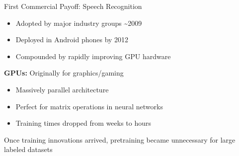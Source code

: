 \begin{frame}{First Commercial Payoff: Speech Recognition}
    \begin{itemize}
        \item Adopted by major industry groups \textasciitilde2009
        \item Deployed in Android phones by 2012
        \item Compounded by rapidly improving GPU hardware
    \end{itemize}
    
    \vspace{1em}
    \textbf{GPUs:} Originally for graphics/gaming
    \begin{itemize}
        \item Massively parallel architecture
        \item Perfect for matrix operations in neural networks
        \item Training times dropped from weeks to hours
    \end{itemize}
    
    \vspace{1em}
    Once training innovations arrived, pretraining became unnecessary for large labeled datasets
\end{frame}
